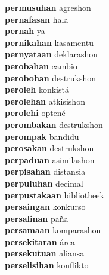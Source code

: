 \textbf{permusuhan } agreshon \\
\textbf{pernafasan } hala \\
\textbf{pernah } ya \\
\textbf{pernikahan } kasamentu \\
\textbf{pernyataan } deklarashon \\
\textbf{perobahan } cambio \\
\textbf{perobohan } destrukshon \\
\textbf{peroleh } konkistá \\
\textbf{perolehan } atkisishon \\
\textbf{perolehi } optené \\
\textbf{perombakan } destrukshon \\
\textbf{perompak } bandidu \\
\textbf{perosakan } destrukshon \\
\textbf{perpaduan } asimilashon \\
\textbf{perpisahan } distansia \\
\textbf{perpuluhan } decimal \\
\textbf{perpustakaan } bibliotheek \\
\textbf{persaingan } konkurso \\
\textbf{persalinan } paña \\
\textbf{persamaan } komparashon \\
\textbf{persekitaran } área \\
\textbf{persekutuan } aliansa \\
\textbf{perselisihan } konflikto \\
